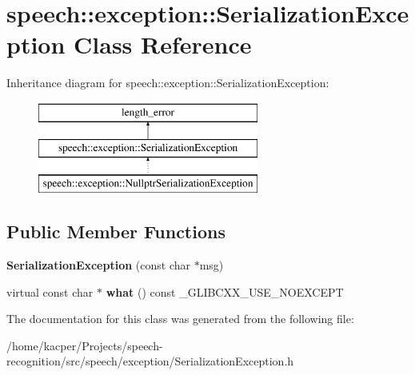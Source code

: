 \hypertarget{classspeech_1_1exception_1_1SerializationException}{\section{speech\+:\+:exception\+:\+:Serialization\+Exception Class Reference}
\label{classspeech_1_1exception_1_1SerializationException}
}
Inheritance diagram for speech\+:\+:exception\+:\+:Serialization\+Exception\+:\begin{figure}[H]
\begin{center}
\leavevmode
\includegraphics[height=3.000000cm]{classspeech_1_1exception_1_1SerializationException}
\end{center}
\end{figure}
\subsection*{Public Member Functions}
\begin{DoxyCompactItemize}
\item 
\hypertarget{classspeech_1_1exception_1_1SerializationException_ac29c05b9159b68b1096e8574af5fee62}{{\bfseries Serialization\+Exception} (const char $\ast$msg)}\label{classspeech_1_1exception_1_1SerializationException_ac29c05b9159b68b1096e8574af5fee62}

\item 
\hypertarget{classspeech_1_1exception_1_1SerializationException_a8e12d8e8ef2e2864ec677c19fcfbc2e9}{virtual const char $\ast$ {\bfseries what} () const \+\_\+\+G\+L\+I\+B\+C\+X\+X\+\_\+\+U\+S\+E\+\_\+\+N\+O\+E\+X\+C\+E\+P\+T}\label{classspeech_1_1exception_1_1SerializationException_a8e12d8e8ef2e2864ec677c19fcfbc2e9}

\end{DoxyCompactItemize}


The documentation for this class was generated from the following file\+:\begin{DoxyCompactItemize}
\item 
/home/kacper/\+Projects/speech-\/recognition/src/speech/exception/Serialization\+Exception.\+h\end{DoxyCompactItemize}
